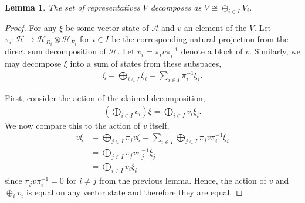 \documentclass[11pt, twocolumn, floatfix, superscriptaddress, aps, prb, raggedbottom]{revtex4-2}
\newtheorem{lemma}[theorem]{Lemma}
\begin{document}
\begin{lemma}
  The set of representatives $V$ decomposes as $V \cong \oplus_{i\in I} V_i$.
  \label{lemma:V_direct_sum}
\end{lemma}
\begin{proof}
  For any $\xi$ be some vector state of $\mathcal{A}$ and $v$ an element of the $V$.
  Let $\pi_i : \mathcal{H} \rightarrow \mathcal{H}_{D_i} \otimes \mathcal{H}_{E_i} $ for $i \in I$ be the corresponding natural projection from the direct sum decomposition of $\mathcal{H}$.
  Let $v_i = \pi_i v \pi_i^{-1}$ denote a block of $v$.
  Similarly, we may decompose $\xi$ into a sum of states from these subspaces,
  \begin{align}
    \xi = \bigoplus_{i \in I} \xi_i = \sum_{i \in I} \pi_i^{-1} \xi_i
    \text{.}
  \end{align}

  First, consider the action of the claimed decomposition,
  \begin{align}
      \left(\bigoplus_{i \in I} v_i \right) \xi = \bigoplus_{i \in I} v_i \xi_i
      \text{.}
  \end{align}
  We now compare this to the action of $v$ itself,
  \begin{align}
    v \xi
    &= \bigoplus_{j \in I} \pi_j v \xi
    = \sum_{i \in I} \bigoplus_{j \in I} \pi_j v \pi_i^{-1} \xi_i \\
    &= \bigoplus_{j \in I} \pi_j v \pi_j^{-1} \xi_j \\
    &= \bigoplus_{i \in I} v_i \xi_i
  \end{align}
  since $\pi_j v \pi_i^{-1} {=} 0$ for $i {\neq} j$ from the previous lemma.
  Hence, the action of $v$ and $\oplus_i v_i$ is equal on any vector state and therefore they are equal.
\end{proof}
\end{document}
